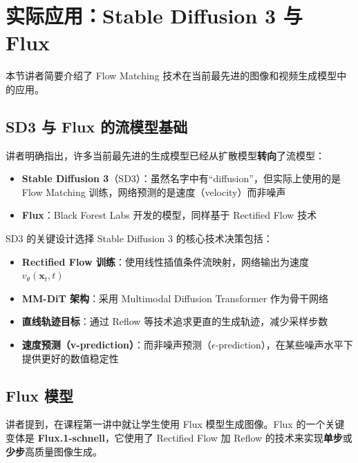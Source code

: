 \section{实际应用：Stable Diffusion 3 与 Flux}

本节讲者简要介绍了 Flow Matching 技术在当前最先进的图像和视频生成模型中的应用。

\subsection{SD3 与 Flux 的流模型基础}

讲者明确指出，许多当前最先进的生成模型已经从扩散模型\textbf{转向}了流模型：

\begin{itemize}
    \item \textbf{Stable Diffusion 3}（SD3）：虽然名字中有``diffusion''，但实际上使用的是 Flow Matching 训练，网络预测的是速度（velocity）而非噪声
    \item \textbf{Flux}：Black Forest Labs 开发的模型，同样基于 Rectified Flow 技术
\end{itemize}

\begin{importantbox}{SD3 的关键设计选择}
Stable Diffusion 3 的核心技术决策包括：
\begin{itemize}
    \item \textbf{Rectified Flow 训练}：使用线性插值条件流映射，网络输出为速度 $v_\theta(\mathbf{x}_t, t)$
    \item \textbf{MM-DiT 架构}：采用 Multimodal Diffusion Transformer 作为骨干网络
    \item \textbf{直线轨迹目标}：通过 Reflow 等技术追求更直的生成轨迹，减少采样步数
    \item \textbf{速度预测（v-prediction）}：而非噪声预测（$\epsilon$-prediction），在某些噪声水平下提供更好的数值稳定性
\end{itemize}
\end{importantbox}

\subsection{Flux 模型}

讲者提到，在课程第一讲中就让学生使用 Flux 模型生成图像。Flux 的一个关键变体是 \textbf{Flux.1-schnell}，它使用了 Rectified Flow 加 Reflow 的技术来实现\textbf{单步}或\textbf{少步}高质量图像生成。

